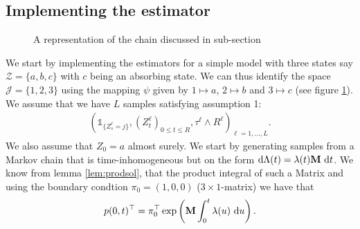 \documentclass[12pt,letter,twoside]{article}
\theoremstyle{plain}
\theoremstyle{definition}
\theoremstyle{remark}
\begin{document}
\subsection{Implementing the estimator}\label{subsec:1}
\begin{figure}
\centering
{}
\caption{A representation of the chain discussed in sub-section \textit{}}
\label{fig:1}
\end{figure}
We start by implementing the estimators for a simple model with three states say $\mathcal Z=\{a,b,c\}$ with $c$ being an absorbing state. We can thus identify the space $\mathcal J=\{1,2,3\}$ using the mapping $\psi$ given by $1\mapsto a$, $2\mapsto b$ and $3\mapsto c$ (see figure \ref{fig:1}). We assume that we have $L$ samples satisfying assumption 1:
\begin{align}
(\mathds 1_{\{Z_s^\ell=j\}},(Z_t^\ell)_{0\le t\le R},\tau^\ell \wedge R^\ell)_{\ell = 1,...,L}.
\end{align}
We also assume that $Z_0=a$ almost surely. We start by generating samples from a Markov chain that is time-inhomogeneous but on the form $\text d\Lambda(t)=\lambda(t)\mathbf M\ \text dt$. We know from lemma \ref{lem:prodsol}, that the product integral of such a Matrix and using the boundary condtion $\pi_0=(1,0,0)$ ($3\times 1$-matrix) we have that
\begin{align}
p(0,t)^\top=\pi_0^\top\exp\left(\mathbf M\int_0^t\lambda(u)\ \text du\right).
\end{align}
\end{document}

